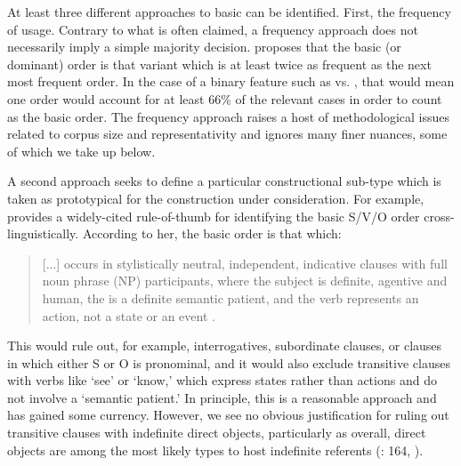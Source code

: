 \documentclass[output=paper,colorlinks,citecolor=brown,collectionchapter]{langscibook}
\begin{document}
At least three different approaches to basic  can be identified. First, the frequency of usage. Contrary to what is often claimed, a frequency approach does not necessarily imply a simple majority decision. \citet[11]{dryer_word_2007} proposes that the basic (or dominant) order is that variant which is at least twice as frequent as the next most frequent order. In the case of a binary feature such as  vs. , that would mean one order would account for at least 66\% of the relevant cases in order to count as the basic order. The frequency approach raises a host of methodological issues related to corpus size and representativity and ignores many finer nuances, some of which we take up below.

A second approach seeks to define a particular constructional sub-type which is taken as prototypical for the construction under consideration. For example, \citet{siewierska1988word} provides a widely-cited rule-of-thumb for identifying the basic S/V/O order cross-linguistically. According to her, the basic order is that which:

\begin{quote}
    [...] occurs in stylistically neutral, independent, indicative clauses with full noun phrase (NP) participants, where the subject is definite, agentive and human, the  is a definite semantic patient, and the verb represents an action, not a state or an event \citep[8]{siewierska1988word}.
\end{quote}


\begin{sloppypar}
This would rule out, for example, interrogatives, subordinate clauses, or clauses in which either S or O is pronominal, and it would also exclude transitive clauses with verbs like `see' or `know,' which express states rather than actions and do not involve a `semantic patient.' In principle, this is a reasonable approach and has gained some currency. However, we see no obvious justification for ruling out transitive clauses with indefinite direct objects, particularly as overall, direct objects are among the most likely  types to host indefinite referents (\citealt{haig_universals_2021}: 164, \citealt{Schnell2023are}).
\end{sloppypar}
\end{document}
